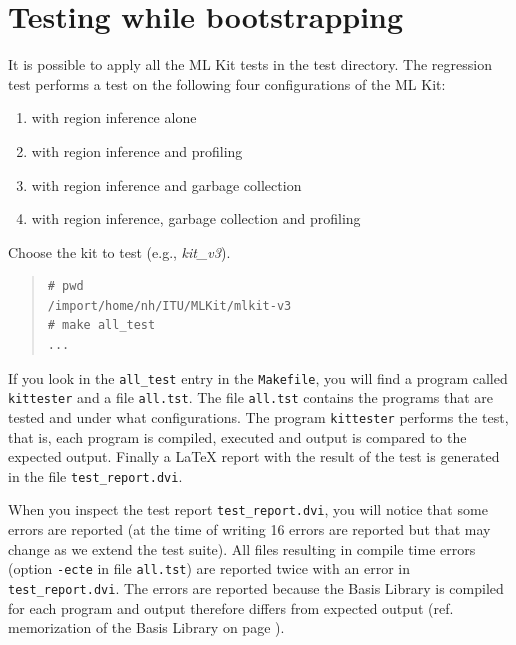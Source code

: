\documentclass[12pt]{book}
\begin{document}

\section{Testing while bootstrapping}
%

It is possible to apply all the ML Kit tests in the test directory.
The regression test performs a test on the following four
configurations of the ML Kit:

\begin{enumerate}
\item with region inference alone
\item with region inference and profiling
\item with region inference and garbage collection
\item with region inference, garbage collection and profiling
\end{enumerate}

Choose the kit to test (e.g., \emph{kit\_v3}).

\begin{quote}
\begin{verbatim}
# pwd
/import/home/nh/ITU/MLKit/mlkit-v3
# make all_test
...
\end{verbatim}
\end{quote}

If you look in the \texttt{all\_test} entry in the {\tt Makefile}, you will
find a program called \texttt{kittester} and a file
\texttt{all.tst}. The file \texttt{all.tst} contains the programs
that are tested and under what configurations. The program
\texttt{kittester} performs the test, that is, each program is
compiled, executed and output is compared to the expected output.
Finally a \LaTeX{} report with the result of the test is generated in
the file \texttt{test\_report.dvi}.

When you inspect the test report \texttt{test\_report.dvi}, you will
notice that some errors are reported (at the time of writing 16 errors
are reported but that may change as we extend the test suite). All
files resulting in compile time errors (option \texttt{-ecte} in file
\texttt{all.tst}) are reported twice with an error in
\texttt{test\_report.dvi}. The errors are reported because the Basis
Library is compiled for each program and output therefore differs from
expected output (ref. memorization of the Basis Library on page
\pageref{memorize_bootstrap.sec}).
\end{document}
